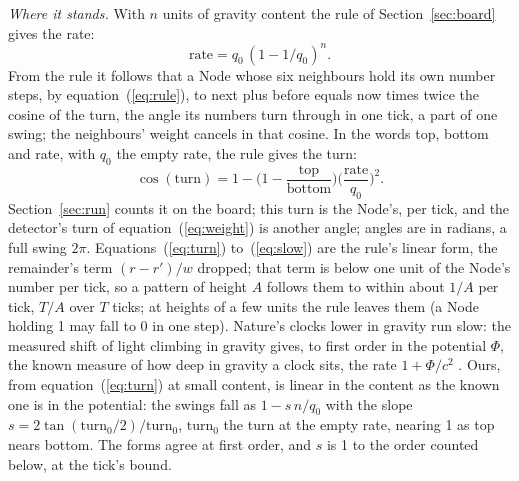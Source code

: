 \documentclass[pdflatex,sn-mathphys-num]{sn-jnl}
\begin{document}
\textit{Where it stands.} With $n$ units of gravity content the rule of Section~\ref{sec:board} gives the rate:
\begin{equation}\label{eq:rate}
\mathrm{rate} = q_0\,(1 - 1/q_0)^{n}.
\end{equation}
From the rule it follows that a Node whose six neighbours hold its own number steps, by equation~(\ref{eq:rule}), to next plus before equals now times twice the cosine of the turn, the angle its numbers turn through in one tick, a part of one swing; the neighbours' weight cancels in that cosine. In the words top, bottom and rate, with $q_0$ the empty rate, the rule gives the turn:
\begin{equation}\label{eq:turn}
\cos(\mathrm{turn}) = 1 - \Big(1 - \frac{\mathrm{top}}{\mathrm{bottom}}\Big)\Big(\frac{\mathrm{rate}}{q_0}\Big)^{2}.
\end{equation}
Section~\ref{sec:run} counts it on the board; this turn is the Node's, per tick, and the detector's turn of equation~(\ref{eq:weight}) is another angle; angles are in radians, a full swing $2\pi$. Equations~(\ref{eq:turn}) to~(\ref{eq:slow}) are the rule's linear form, the remainder's term $(r - r')/w$ dropped; that term is below one unit of the Node's number per tick, so a pattern of height $A$ follows them to within about $1/A$ per tick, $T/A$ over $T$ ticks; at heights of a few units the rule leaves them (a Node holding 1 may fall to 0 in one step). Nature's clocks lower in gravity run slow: the measured shift of light climbing in gravity \cite{pound1960} gives, to first order in the potential $\Phi$, the known measure of how deep in gravity a clock sits, the rate $1 + \Phi/c^2$ \cite{einstein1911}. Ours, from equation~(\ref{eq:turn}) at small content, is linear in the content as the known one is in the potential: the swings fall as $1 - s\,n/q_0$ with the slope $s = 2\tan(\mathrm{turn}_0/2)/\mathrm{turn}_0$, $\mathrm{turn}_0$ the turn at the empty rate, nearing 1 as top nears bottom. The forms agree at first order, and $s$ is 1 to the order counted below, at the tick's bound.
\end{document}
